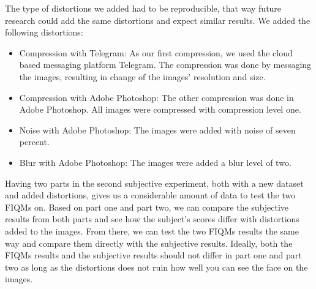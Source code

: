 The type of distortions we added had to be reproducible, that way future research could add the same distortions and expect similar results. We added the following distortions:
%
\begin{itemize}
    \item Compression with Telegram: As our first compression, we used the cloud based messaging platform Telegram. The compression was done by messaging the images, resulting in change of the images' resolution and size.
    \item Compression with Adobe Photoshop: The other compression was done in Adobe Photoshop. All images were compressed with compression level one.
    \item Noise with Adobe Photoshop: The images were added with noise of seven percent. 
    \item Blur with Adobe Photoshop: The images were added a blur level of two. 
\end{itemize}
%


Having two parts in the second subjective experiment, both with a new dataset and added distortions, gives us a considerable amount of data to test the two FIQMs on. Based on part one and part two, we can compare the subjective results from both parts and see how the subject's scores differ with distortions added to the images. From there, we can test the two FIQMs results the same way and compare them directly with the subjective results. Ideally, both the FIQMs results and the subjective results should not differ in part one and part two as long as the distortions does not ruin how well you can see the face on the images.   
